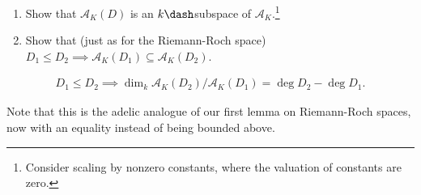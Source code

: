 \begin{exercise}[?]

\envlist

\begin{enumerate}
\def\labelenumi{\alph{enumi}.}
\item
  Show that \(\mathcal{A}_K(D)\) is an \(k\dash\)subspace of
  \(\mathcal{A}_K\).\footnote{Consider scaling by nonzero constants,
    where the valuation of constants are zero.}
\item
  Show that (just as for the Riemann-Roch space)
  \(D_1 \leq D_2 \implies \mathcal{A}_K(D_1) \subseteq \mathcal{A}_K(D_2)\).
\end{enumerate}

\end{exercise}

\begin{lemma}[?]

\begin{align*}  
D_1 \leq D_2 \implies \dim_k \mathcal{A}_K(D_2) / \mathcal{A}_K(D_1) = \deg D_2 - \deg D_1
.\end{align*}

\end{lemma}

Note that this is the adelic analogue of our first lemma on Riemann-Roch
spaces, now with an equality instead of being bounded above.

